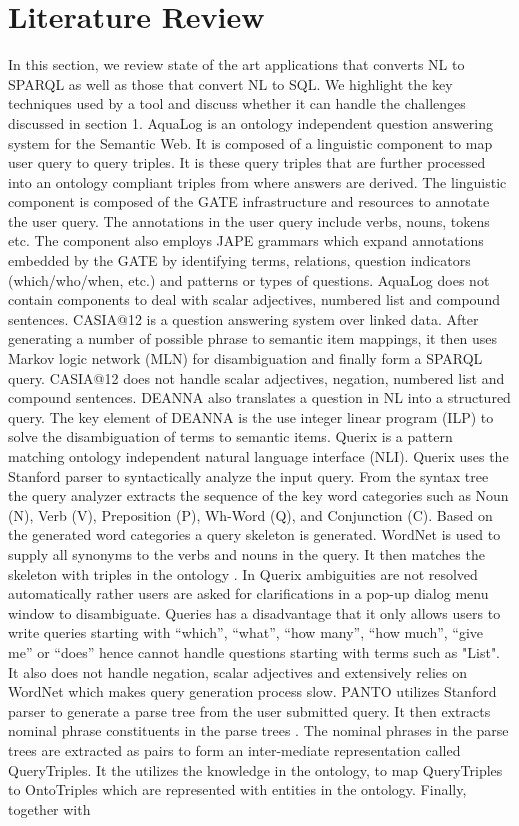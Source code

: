 \documentclass[review]{elsarticle}
\begin{document}
\section{Literature Review}
In this section, we review state of the art applications that  converts NL to SPARQL as well as those that convert NL to SQL. We highlight the key techniques used by a tool and discuss whether it can handle the challenges discussed in section 1.
AquaLog \citep{aqualog12} is an ontology independent question answering system for the Semantic Web. It is composed of a linguistic component to map user query to query triples. It is these query triples that are further processed into an ontology compliant triples from where answers are derived. The linguistic component is composed of the GATE infrastructure  \citep{gate12} and resources to annotate the user query. The annotations in the user query include verbs, nouns, tokens etc. The component also employs JAPE grammars which expand annotations embedded by the GATE by  identifying terms, relations, question indicators (which/who/when, etc.) and patterns or types of questions.  AquaLog does not contain components  to deal with  scalar adjectives, numbered list and compound sentences. CASIA@12 \citep{Casia12} is a question answering system over linked data. After generating a number of possible phrase to semantic item mappings, it then uses Markov logic network (MLN) for disambiguation and finally form a SPARQL query. CASIA@12 does not handle scalar adjectives, negation, numbered list and compound sentences.  DEANNA \citep{Yahya2012} also translates a question  in NL into a structured query. The key element of DEANNA is the use integer linear program (ILP) to  solve the disambiguation of terms to semantic items. Querix \citep{Querix12} is a pattern matching ontology independent  natural language interface (NLI). Querix uses the Stanford parser to syntactically analyze the input query. From the syntax tree the query analyzer extracts the sequence of the key word categories such as Noun (N), Verb (V), Preposition (P), Wh-Word (Q), and Conjunction (C).  Based on the generated word categories a query skeleton is generated.  WordNet is used to supply all synonyms to the verbs and nouns in the query. It then matches the skeleton with triples in the ontology . In Querix  ambiguities are not resolved automatically  rather users are asked   for clarifications in a pop-up dialog menu window to disambiguate. Queries has a disadvantage that it only allows users  to write queries  starting with “which”, “what”, “how many”, “how much”, “give me” or “does” hence cannot handle questions starting with terms such as "List".  It also does not handle negation, scalar adjectives and extensively relies on WordNet which makes query generation process slow.   PANTO \citep{panto12} utilizes Stanford parser \citep{Klein2003} to generate a parse tree from the user submitted query. It then extracts nominal phrase constituents in the parse trees . The nominal phrases in the parse trees are extracted  as pairs to form an inter-mediate representation called QueryTriples.  It the utilizes the  knowledge in the ontology, to map QueryTriples to OntoTriples which are represented with entities in the ontology. Finally, together with 
\end{document}
